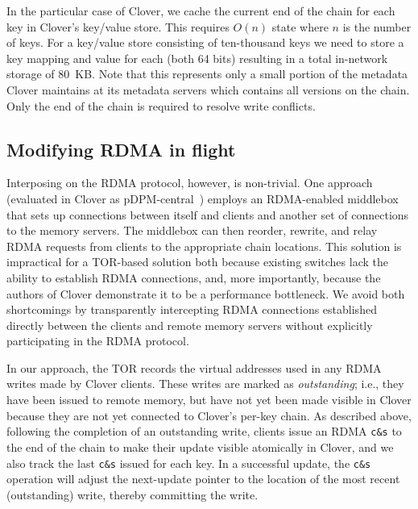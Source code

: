 

In the particular case of Clover, we cache the current end of the
chain for each key in Clover's key/value store. This requires $O(n)$
state where $n$ is the number of keys. For a key/value store
consisting of ten-thousand keys we need to store a key mapping and
value for each (both 64 bits) resulting in a total in-network storage
of 80~KB.  Note that this represents only a small portion of the
metadata Clover maintains at its metadata servers which contains all
versions on the chain. Only the end of the chain is required to
resolve write conflicts.


\subsection{Modifying RDMA in flight}

Interposing on the RDMA protocol, however, is non-trivial. One approach
(evaluated in Clover as pDPM-central~\cite{clover}) employs an RDMA-enabled
middlebox that sets up connections between itself and clients and another set
of connections to the memory servers. The middlebox can then reorder, rewrite,
and relay RDMA requests from clients to the appropriate chain locations. This
solution is impractical for a TOR-based solution both because existing
switches lack the ability to establish RDMA connections, and, more
importantly, because the authors of Clover demonstrate it to be a
performance bottleneck. We avoid both shortcomings by transparently
intercepting RDMA connections established directly between the clients and
remote memory servers without explicitly participating in the RDMA protocol.

In our approach, the TOR records the virtual addresses used in any
RDMA writes made by Clover clients. These writes are marked as
\textit{outstanding}; i.e., they have been issued to remote memory,
but have not yet been made visible in Clover because they are not yet
connected to Clover's per-key chain.  As described above, following
the completion of an outstanding write, clients issue an RDMA \texttt{c\&s} to
the end of the chain to make their update visible atomically in
Clover, and we also track the last \texttt{c\&s} issued for each key.  In a
successful update, the \texttt{c\&s} operation will adjust the next-update
pointer to the location of the most recent (outstanding) write,
thereby committing the write.

